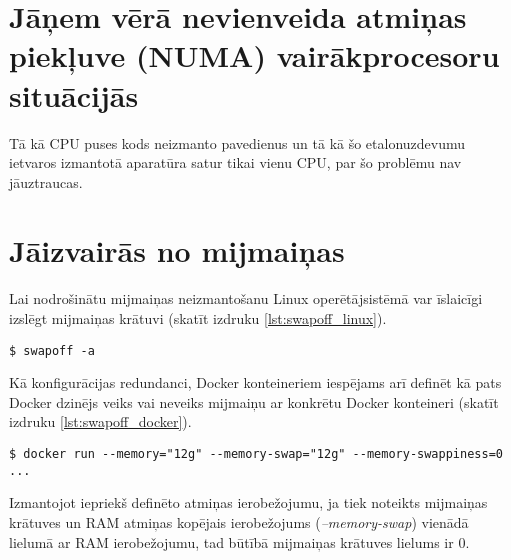 \section{Jāņem vērā nevienveida atmiņas piekļuve (NUMA) vairākprocesoru situācijās}
Tā kā CPU puses kods neizmanto pavedienus un tā kā šo etalonuzdevumu ietvaros
izmantotā aparatūra satur tikai vienu CPU, par šo problēmu nav jāuztraucas.


\section{Jāizvairās no mijmaiņas}
Lai nodrošinātu mijmaiņas neizmantošanu Linux operētājsistēmā var īslaicīgi
izslēgt mijmaiņas krātuvi (skatīt izdruku \ref{lst:swapoff_linux}).
\begin{lstlisting}[caption={Mijmaiņas krātuves izlēgšana uz Linux}, label=lst:swapoff_linux]
$ swapoff -a
\end{lstlisting}

Kā konfigurācijas redundanci, Docker konteineriem iespējams arī definēt kā pats
Docker dzinējs veiks vai neveiks mijmaiņu ar konkrētu Docker konteineri (skatīt
izdruku \ref{lst:swapoff_docker}).

\begin{lstlisting}[caption={Mijmaiņas krātuves izlēgšana Docker konteinerim},
    label=lst:swapoff_docker]
$ docker run --memory="12g" --memory-swap="12g" --memory-swappiness=0 ...
\end{lstlisting}

Izmantojot iepriekš definēto atmiņas ierobežojumu, ja tiek noteikts mijmaiņas
krātuves un RAM atmiņas kopējais ierobežojums (\textit{--memory-swap}) vienādā
lielumā ar RAM ierobežojumu, tad būtībā mijmaiņas krātuves lielums ir 0.

